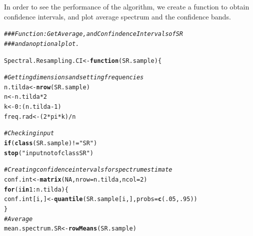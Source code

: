 \documentclass{article}\usepackage[]{graphicx}\usepackage[]{color}
\makeatletter
\newcommand{\hlnum}[1]{\textcolor[rgb]{0.686,0.059,0.569}{#1}}%
\newcommand{\hlstr}[1]{\textcolor[rgb]{0.192,0.494,0.8}{#1}}%
\newcommand{\hlcom}[1]{\textcolor[rgb]{0.678,0.584,0.686}{\textit{#1}}}%
\newcommand{\hlopt}[1]{\textcolor[rgb]{0,0,0}{#1}}%
\newcommand{\hlstd}[1]{\textcolor[rgb]{0.345,0.345,0.345}{#1}}%
\newcommand{\hlkwa}[1]{\textcolor[rgb]{0.161,0.373,0.58}{\textbf{#1}}}%
\newcommand{\hlkwb}[1]{\textcolor[rgb]{0.69,0.353,0.396}{#1}}%
\newcommand{\hlkwc}[1]{\textcolor[rgb]{0.333,0.667,0.333}{#1}}%
\newcommand{\hlkwd}[1]{\textcolor[rgb]{0.737,0.353,0.396}{\textbf{#1}}}%
\newenvironment{kframe}{%
 \def\at@end@of@kframe{}%
 \ifinner\ifhmode%
  \def\at@end@of@kframe{\end{minipage}}%
  \begin{minipage}{\columnwidth}%
 \fi\fi%
 \def\FrameCommand##1{\hskip\@totalleftmargin \hskip-\fboxsep
 \colorbox{shadecolor}{##1}\hskip-\fboxsep
     \hskip-\linewidth \hskip-\@totalleftmargin \hskip\columnwidth}%
 \MakeFramed {\advance\hsize-\width
   \@totalleftmargin\z@ \linewidth\hsize
   \@setminipage}}%
 {\par\unskip\endMakeFramed%
 \at@end@of@kframe}
\newenvironment{knitrout}{}{} %
\makeatother
\begin{document}
In order to see the performance of the algorithm, we create a function to obtain confidence intervals, and plot average spectrum and the confidence bands.

\begin{knitrout}\footnotesize
{}\color{fgcolor}\begin{kframe}
\begin{alltt}
\hlcom{### Function: Get Average, and Confindence Intervals of SR}
\hlcom{###           and an optional plot.}

\hlstd{Spectral.Resampling.CI} \hlkwb{<-} \hlkwa{function}\hlstd{(}\hlkwc{SR.sample}\hlstd{) \{}

  \hlcom{# Getting dimensions and setting frequencies}
  \hlstd{n.tilda} \hlkwb{<-} \hlkwd{nrow}\hlstd{(SR.sample)}
  \hlstd{n} \hlkwb{<-} \hlstd{n.tilda}\hlopt{*}\hlnum{2}
  \hlstd{k} \hlkwb{<-} \hlnum{0}\hlopt{:}\hlstd{(n.tilda} \hlopt{-} \hlnum{1}\hlstd{)}
  \hlstd{freq.rad} \hlkwb{<-} \hlstd{(}\hlnum{2}\hlopt{*}\hlstd{pi}\hlopt{*}\hlstd{k)}\hlopt{/} \hlstd{n}

  \hlcom{# Checking input}
  \hlkwa{if}\hlstd{(}\hlkwd{class}\hlstd{(SR.sample)} \hlopt{!=} \hlstr{"SR"}\hlstd{)}
    \hlkwd{stop}\hlstd{(}\hlstr{"input not of class SR"}\hlstd{)}

  \hlcom{# Creating confidence intervals for spectrum estimate }
  \hlstd{conf.int} \hlkwb{<-} \hlkwd{matrix}\hlstd{(}\hlnum{NA}\hlstd{,} \hlkwc{nrow} \hlstd{= n.tilda,} \hlkwc{ncol} \hlstd{=} \hlnum{2}\hlstd{)}
  \hlkwa{for}\hlstd{(i} \hlkwa{in} \hlnum{1}\hlopt{:}\hlstd{n.tilda) \{}
    \hlstd{conf.int[i, ]} \hlkwb{<-} \hlkwd{quantile}\hlstd{(SR.sample[i, ],} \hlkwc{probs} \hlstd{=} \hlkwd{c}\hlstd{(}\hlnum{.05}\hlstd{,} \hlnum{.95}\hlstd{))}
  \hlstd{\}}
  \hlcom{# Average}
  \hlstd{mean.spectrum.SR} \hlkwb{<-} \hlkwd{rowMeans}\hlstd{(SR.sample)}


\end{alltt}
\end{kframe}
\end{knitrout}
\end{document}
